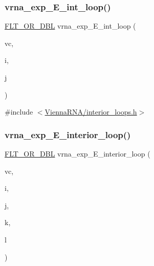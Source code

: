 \subsubsection{\texorpdfstring{vrna\+\_\+exp\+\_\+\+E\+\_\+int\+\_\+loop()}{vrna\_exp\_E\_int\_loop()}}
{\footnotesize\ttfamily \mbox{\hyperlink{group__data__structures_ga31125aeace516926bf7f251f759b6126}{F\+L\+T\+\_\+\+O\+R\+\_\+\+D\+BL}} vrna\+\_\+exp\+\_\+\+E\+\_\+int\+\_\+loop (\begin{DoxyParamCaption}\item[{\mbox{\hyperlink{group__fold__compound_ga1b0cef17fd40466cef5968eaeeff6166}{vrna\+\_\+fold\+\_\+compound\+\_\+t}} $\ast$}]{vc,  }\item[{int}]{i,  }\item[{int}]{j }\end{DoxyParamCaption})}



{\ttfamily \#include $<$\mbox{\hyperlink{interior__loops_8h}{Vienna\+R\+N\+A/interior\+\_\+loops.\+h}}$>$}

\mbox{\label{group__loops_gae27361b54e40da510011988326fcdfe1}} 
\subsubsection{\texorpdfstring{vrna\+\_\+exp\+\_\+\+E\+\_\+interior\+\_\+loop()}{vrna\_exp\_E\_interior\_loop()}}
{\footnotesize\ttfamily \mbox{\hyperlink{group__data__structures_ga31125aeace516926bf7f251f759b6126}{F\+L\+T\+\_\+\+O\+R\+\_\+\+D\+BL}} vrna\+\_\+exp\+\_\+\+E\+\_\+interior\+\_\+loop (\begin{DoxyParamCaption}\item[{\mbox{\hyperlink{group__fold__compound_ga1b0cef17fd40466cef5968eaeeff6166}{vrna\+\_\+fold\+\_\+compound\+\_\+t}} $\ast$}]{vc,  }\item[{int}]{i,  }\item[{int}]{j,  }\item[{int}]{k,  }\item[{int}]{l }\end{DoxyParamCaption})}



